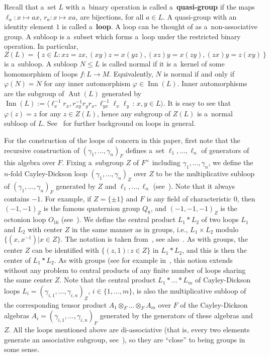 \documentclass{jonasart}
\begin{document}
	Recall that a~set $L$ with a~binary operation is called a~\textbf{quasi-group} if the maps $\ell_a : x \mapsto ax$, $r_a : x \mapsto xa$, are bijections, for all $a \in L$. A quasi-group with an identity element $1$ is called a~\textbf{loop}. A loop can be thought of as a~non-associative group. A subloop is a~subset which forms a~loop under the restricted binary operation. In particular, 
    \[
        Z(L)= \left\{z \in L : xz = zx, (xy)z = x(yz), (xz)y = x(zy), (zx)y = z(xy)\right\}
    \]
    is a~subloop. A subloop $N \leqslant L$ is called normal if it is a~kernel of some homomorphism of loops $f: L \to M$. Equivalently, $N$ is normal if and only if $\varphi(N) = N$ for any inner automorphism $\varphi \in \operatorname{Inn}(L)$. Inner automorphisms are the subgroup of $\operatorname{Aut}(L)$ generated by $\operatorname{Inn}(L):= \langle \ell^{-1}_x r_x, r^{-1}_{xy}r_y r_x, \ell^{-1}_{yx}\ell_x\ell_y \, : \, x,y \in L \rangle$. It is easy to see that $\varphi(z)=z$ for any $z \in Z(L)$, hence any subgroup of $Z(L)$ is a~normal subloop of $L$. See~\cite{Bruck:1958} for further background on loops in general.

	For the construction of the loops of concern in this paper, first note that the recursive construction of $(\gamma_1,\dots,\gamma_n )_F$ defines a~set $\ell_1,\dots,\ell_n$ of generators of this algebra over $F$. Fixing a~subgroup $Z$ of $F^\times$ including $\gamma_1,\dots,\gamma_n$, we define the $n$-fold Cayley-Dickson loop $(\gamma_1,\dots,\gamma_n )_Z$ over $Z$ to be the multiplicative subloop of $(\gamma_1,\dots,\gamma_n )_F$ generated by $Z$ and $\ell_1,\dots,\ell_n$ (see~\cite{Kirshtein:2014}). Note that it always contains $-1$. For example, if $Z=\{\pm 1\}$ and $F$ is any field of characteristic $0$, then $(-1,-1)_Z$ is the famous quaternion group $Q_8$, and $(-1,-1,-1)_Z$ is the octonion loop $O_{16}$ (see~\cite{Kirshtein:2012}). We define the central product $L_1 \ast L_2$ of two loops $L_1$ and $L_2$ with center $Z$ in the same manner as in groups, i.e., $L_1 \times L_2$ modulo $\{(x,x^{-1})|x\in Z\}$. The notation is taken from~\cite{Gorenstein:1979}, see also~\cite[Chapter 2, Section 5]{Gorenstein:1980}. As with groups, the center $Z$ can be identified with $\{(z,1): z\in Z\}$ in $L_1 \ast L_2$, and this is then the center of $L_1 \ast L_2$. As with groups (see for example in~\cite{Gorenstein:1979}, this notion extends without any problem to central products of any finite number of loops sharing the same center $Z$. Note that the central product $L_1 \ast \dots \ast L_m$ of Cayley-Dickson loops $L_i =(\gamma_{i,1},\dots,\gamma_{i,n})_Z$, $i \in \{1,\dots,m\}$, is also the multiplicative subloop of the corresponding tensor product $A_1\otimes_F \dots \otimes_F A_m$ over $F$ of the Cayley-Dickson algebras $A_i =(\gamma_{i,1},\dots,\gamma_{i,n})_F$ generated by the generators of these algebras and $Z$. All the loops mentioned above are di-associative (that is, every two elements generate an associative subgroup, see~\cite[Theorem 5.4]{Culbert:2007}), so they are ``close'' to being groups in some sense.
\end{document}
